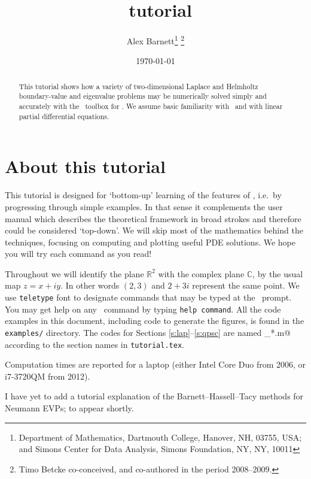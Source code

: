 \documentclass[11pt]{article}
\begin{document}
\title{\mpspack\ tutorial}
\author{Alex Barnett\footnote{Department of Mathematics, Dartmouth College, Hanover, NH, 03755, USA; and Simons Center for Data Analysis, Simons Foundation, NY, NY, 10011} \footnote{Timo Betcke co-conceived, and co-authored in the period 2008--2009.}}

\date{\today}   %

\maketitle
\begin{abstract}
This tutorial shows how a variety of two-dimensional Laplace and Helmholtz
boundary-value and eigenvalue problems
may be numerically solved simply and accurately with the \mpspack\ toolbox
for \matlab. We assume basic familiarity with \matlab\
and with linear partial differential equations.
\end{abstract}

\setcounter{tocdepth}{2}
\tableofcontents

\section{About this tutorial}

This tutorial is designed for `bottom-up' learning of the features
of \mpspack, i.e.\ by progressing through simple examples.
In that sense it complements the user manual which describes
the theoretical framework in broad strokes and therefore could
be considered `top-down'.
We will skip most of the mathematics behind the techniques,
focusing on computing and plotting useful PDE solutions.
We hope you will try each command as you read!

Throughout we will identify the plane $\mathbb{R}^2$ with the complex
plane $\mathbb{C}$, by the usual map $z=x+iy$. In other words
$(2,3)$ and $2+3i$ represent the same point.
We use {\tt teletype} font to designate commands that may be typed
at the \matlab\ prompt.
You may get help on any \mpspack\ command by typing {\tt help command}.
All the code examples in this document, including code to generate the
figures, is found in the {\tt examples/} directory.
The codes for Sections \ref{s:lap}--\ref{s:qpsc} are named
\verb@tut_*.m@ according to the section names in {\tt tutorial.tex}.

Computation times are reported for a laptop
(either Intel Core Duo from 2006, or i7-3720QM from 2012).

I have yet to add a tutorial explanation of the Barnett--Hassell--Tacy
methods for Neumann EVPs; to appear shortly.











 

\end{document}
